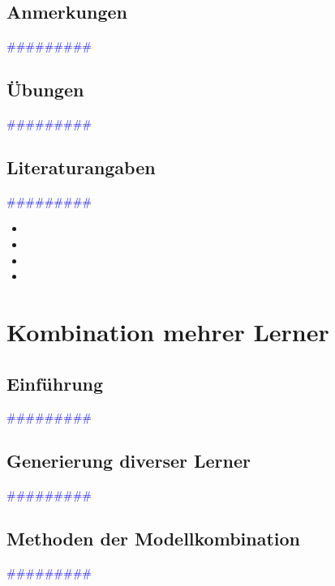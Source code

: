 \documentclass{article}
\begin{document}
  \subsection{Anmerkungen} %
      \textcolor{blue}{\#\#\#\#\#\#\#\#\#}
  \subsection{Übungen} %
      \textcolor{blue}{\#\#\#\#\#\#\#\#\#}
  \subsection{Literaturangaben} %
      \textcolor{blue}{\#\#\#\#\#\#\#\#\#}

      \begin{itemize}
      \color{red}
        \item 
        \item
       \color{ForestGreen}
        \item
        \item
      \end{itemize}




\newpage
\section{Kombination mehrer Lerner} %
  \subsection{Einführung} %
      \textcolor{blue}{\#\#\#\#\#\#\#\#\#}
  \subsection{Generierung diverser Lerner} %
      \textcolor{blue}{\#\#\#\#\#\#\#\#\#}
  \subsection{Methoden der Modellkombination} %
      \textcolor{blue}{\#\#\#\#\#\#\#\#\#}
\end{document}
